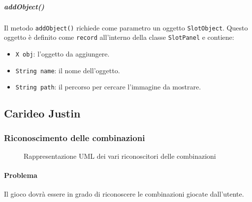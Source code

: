 \documentclass[a4paper,12pt]{report}
\begin{document}
\subparagraph{addObject()}
Il metodo \texttt{addObject()} richiede come parametro un oggetto \texttt{SlotObject}. Questo oggetto è definito come \texttt{record} all’interno della classe \texttt{SlotPanel} e contiene:

\begin{itemize}
    \item \texttt{X obj}: l'oggetto da aggiungere.
    \item \texttt{String name}: il nome dell'oggetto.
    \item \texttt{String path}: il percorso per cercare l'immagine da mostrare.
\end{itemize}

\subsection{Carideo Justin}
\subsubsection*{Riconoscimento delle combinazioni}
\begin{figure}[H]
	\centering{}
	
	\caption{Rappresentazione UML dei vari riconoscitori delle combinazioni}
	\label{img:recognizers}
\end{figure}
\paragraph{Problema}
Il gioco dovrà essere in grado di riconoscere le combinazioni giocate dall’utente.
\end{document}

